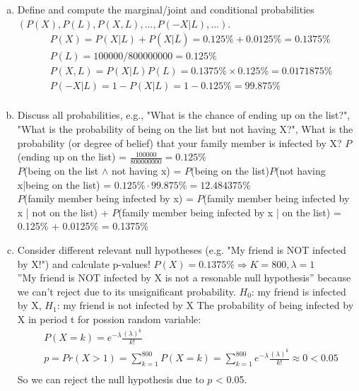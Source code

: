 \documentclass{article}
\begin{document}
\begin{flushleft}
\begin{enumerate}[(a)]
    \item Define and compute the marginal/joint and conditional probabilities $(P(X), P(L), P(X,L),
    ..., P(-X|L), ...)$.
    \newline
    \begin{align*}
        &P(X) = P(X|L) + P(X|\overline{L}) = 0.125\% + 0.0125\% = 0.1375\% \\
        &P(L) = 100000 / 800000000 = 0.125\% \\
        &P(X,L) = P(X|L)P(L) = 0.1375\% \times 0.125\% = 0.0171875\% \\
        &P(-X|L) = 1 - P(X|L) = 1 - 0.125\% = 99.875\% \\
    \end{align*}
    \item Discuss all probabilities, e.g., "What is the chance of ending up on the list?", "What is the
    probability of being on the list but not having X?", What is the probability (or degree of
    belief) that your family member is infected by X?
    $P$(ending up on the list) = $\displaystyle\frac{100000}{800000000} = 0.125\%$ \\
    $P$(being on the list $\land$ not having x) = $P$(being on the list)$P$(not having x|being on the list) = $0.125\% \cdot 99.875\% = 12.484375\%$ \\
    $P$(family member being infected by x) = $P$(family member being infected by x | not on the list) + $P$(family member being infected by x | on the list) = 0.125\% + 0.0125\% = 0.1375\% \\
    \item Consider different relevant null hypotheses (e.g. "My friend is NOT infected by X!") and
    calculate p-values!
    \newline
    $P(X) = 0.1375\% \Longrightarrow K = 800, \lambda = 1$\\
    ”My friend is NOT infected by X is not a resonable null hypothesis” because we can't reject due to its unsignificant probability.
    \newline
    $H_0$: my friend is infected by X, $H_1$: my friend is not infected by X
    \newline
    The probability of being infected by X in period t for possion random variable: \\
    \begin{align*}
        &P(X = k) = e^{-\lambda} \frac{(\lambda)^k}{k!} \\
        &p = Pr(X > 1) = \sum_{k=1}^{800} P(X = k) = \sum_{k=1}^{800} e^{-\lambda} \frac{(\lambda)^k}{k!} \approx 0 < 0.05\\
    \end{align*}
    So we can reject the null hypothesis due to $p$ < 0.05.
\end{enumerate}
\end{flushleft}
\end{document}
